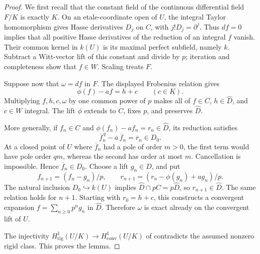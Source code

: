 \documentclass[11pt,a4paper]{article}
\theoremstyle{remark}
\begin{document}
\begin{proof}
We first recall that the constant field of the continuous differential
field $F/K$ is exactly $K$. On an etale-coordinate open of $U$, the
integral Taylor homomorphism gives Hasse derivatives $D_j$ on $C$,
with $j!D_j=\partial^j$. Thus $df=0$ implies that all positive Hasse
derivatives of the reduction of an integral $f$ vanish. Their common
kernel in $k(U)$ is its maximal perfect subfield, namely $k$.
Subtract a Witt-vector lift of this constant and divide by $p$;
iteration and completeness show that $f\in W$. Scaling treats $F$.

Suppose now that $\omega=df$ in $F$. The displayed Frobenius relation
gives
\[
 \phi(f)-af=h+c\qquad(c\in K).
\]
Multiplying $f,h,c,\omega$ by one common power of $p$ makes all of
$f\in C$, $h\in\widehat D$, and $c\in W$ integral. The lift $\phi$
extends to $C$, fixes $p$, and preserves $\widehat D$.

More generally, if $f_n\in C$ and
$\phi(f_n)-af_n=r_n\in\widehat D$, its reduction satisfies
\[
 \overline f_n^{\,q}-\overline a\,\overline f_n
       =\overline r_n\in D_0.
\]
At a closed point of $U$ where $\overline f_n$ had a pole of order
$m>0$, the first term would have pole order $qm$, whereas the second
has order at most $m$. Cancellation is impossible. Hence
$\overline f_n\in D_0$. Choose a lift $g_n\in D$, and put
\[
 f_{n+1}=(f_n-g_n)/p,\qquad
 r_{n+1}=(r_n-\phi(g_n)+ag_n)/p.
\]
The natural inclusion $D_0\hookrightarrow k(U)$ implies
$\widehat D\cap pC=p\widehat D$, so $r_{n+1}\in\widehat D$.
The same relation holds for $n+1$. Starting with $r_0=h+c$, this
constructs a convergent expansion $f=\sum_{n\geq0}p^ng_n$ in
$\widehat D$. Therefore $\omega$ is exact already on the convergent
lift of $U$.

The injectivity
$H^1_{\mathrm{rig}}(U/K)\to H^1_{\mathrm{conv}}(U/K)$
of \cite[Theorem~3.2.1]{CaroDAddezioInjectivity} contradicts the
assumed nonzero rigid class. This proves the lemma.
\end{proof}



\end{document}
